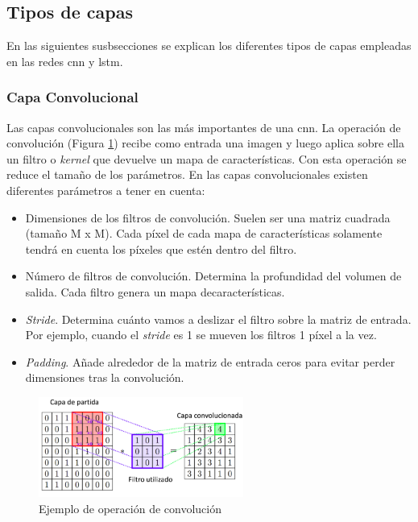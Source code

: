 \subsection{Tipos de capas}\label{tipos_capas}

En las siguientes susbsecciones se explican los diferentes tipos de capas empleadas en las redes \acrshort{cnn} y \acrshort{lstm}.


\subsubsection{Capa Convolucional}

Las capas convolucionales son las más importantes de una \acrshort{cnn}. La operación de convolución (Figura \ref{fig.convolucion}) recibe como entrada una imagen y luego aplica sobre ella un filtro o \textit{kernel} que devuelve un mapa de características. Con esta operación se reduce el tamaño de los parámetros. En las capas convolucionales existen diferentes parámetros a tener en cuenta:\\

\begin{itemize}
    \item Dimensiones de los filtros de convolución. Suelen ser una matriz cuadrada (tamaño M x M). Cada píxel de cada mapa de características solamente tendrá en cuenta los píxeles que estén dentro del filtro.
    
    \item Número de filtros de convolución. Determina la profundidad del volumen de salida. Cada filtro genera un mapa decaracterísticas.
    
    \item \textit{Stride}. Determina cuánto vamos a deslizar el filtro sobre la matriz de entrada. Por  ejemplo, cuando el \textit{stride} es 1 se mueven los filtros 1 píxel a la vez. 
    
    \item \textit{Padding}. Añade alrededor de la matriz de entrada ceros para evitar perder dimensiones tras la convolución.
\end{itemize}

\begin{figure}[H]
  \begin{center}
    \includegraphics[width=0.6\textwidth]{figures/Introduccion/convolucion.png}
		\caption{Ejemplo de operación de convolución}
		\label{fig.convolucion}
		\end{center}
\end{figure}

